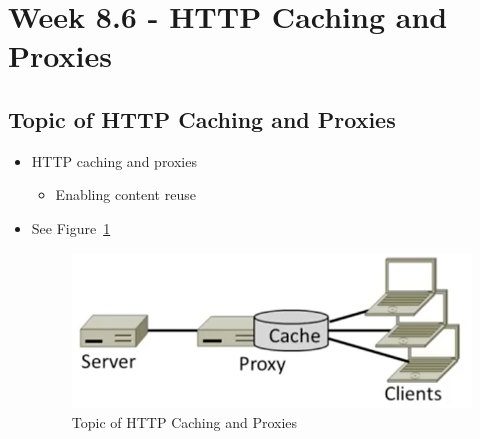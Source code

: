 \documentclass[12pt]{ctexart}   %
\begin{document}
\section{Week 8.6 - HTTP Caching and Proxies}	
	\subsection{Topic of HTTP Caching and Proxies}
	\begin{itemize}
		\item HTTP caching and proxies
		\begin{itemize}
			\item Enabling content reuse
		\end{itemize}
		\item See Figure~\ref{fig:8-6-1}
		  
		 \begin{figure}[h!] %
		\centering
		 \includegraphics[scale=0.7]{images/8-6-1}
		\caption{ Topic of HTTP Caching and Proxies}
		 \label{fig:8-6-1}
		 \end{figure}
	\end{itemize}
	
\end{document}
